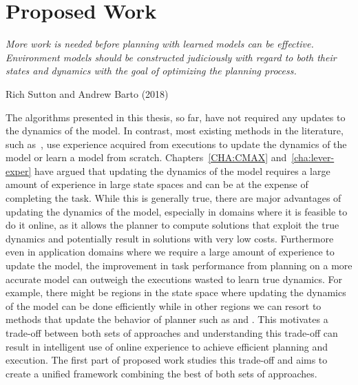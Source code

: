 \chapter{Proposed Work}
\label{cha:proposed-work}

\epigraph{\textit{More work is needed before planning with learned
    models can be effective. Environment models should be
    constructed judiciously with regard to both their states and
    dynamics with the goal of optimizing the planning process.}}{Rich
  Sutton and Andrew Barto (2018)}

The algorithms presented in this thesis, so
far, have not required any updates to the dynamics of the model. In
contrast, most existing methods in the literature, such
as~\cite{DBLP:journals/ml/KearnsS02, DBLP:journals/jmlr/BrafmanT02,
  DBLP:conf/atal/JongS07, 
  DBLP:journals/pami/DeisenrothFR15, DBLP:conf/icml/AbbeelQN06, 
  DBLP:conf/aaai/Jiang18, rastogi2018sample}, use experience
acquired from executions to update the dynamics of the model or learn
a model from scratch.
Chapters~\ref{CHA:CMAX} and~\ref{cha:lever-exper} have
argued that updating the dynamics of the model requires a large amount
of experience in large state spaces and can be at the expense of
completing the task. While this is generally true, there are major
advantages of updating the dynamics of the model, especially in
domains where it 
is feasible to do it online, as it allows the planner to compute
solutions that exploit the true dynamics and potentially result in
solutions with very low costs. Furthermore even in application domains
where we require a large amount of experience to update the model,
the improvement in task performance from planning on a more accurate
model can outweigh the executions wasted to learn true dynamics. For
example, there might be regions in the state space where updating the
dynamics of the model can be done efficiently while in other regions
we can resort to methods that update the behavior of planner such as
\cmax{} and \cmaxpp{}. This motivates a trade-off between both sets of
approaches and understanding this trade-off can result in intelligent
use of online experience to achieve efficient planning and
execution. The first part of proposed work studies this trade-off
and aims to create a unified framework combining the best of both
sets of approaches.

